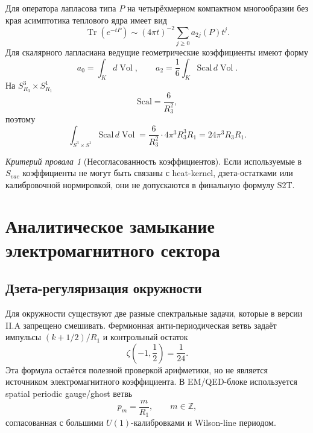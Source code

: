 \documentclass[12pt,a4paper]{report}
\theoremstyle{remark}
\newtheorem{nogocriterion}{Критерий провала}[chapter]
\DeclareMathOperator{\Tr}{Tr}
\DeclareMathOperator{\Vol}{Vol}
\begin{document}
Для оператора лапласова типа \(P\) на четырёхмерном компактном многообразии без края асимптотика теплового ядра имеет вид
\begin{equation}
    \Tr(e^{-tP})\sim (4\pi t)^{-2}\sum_{j\geq 0} a_{2j}(P)t^j.
\end{equation}
Для скалярного лапласиана ведущие геометрические коэффициенты имеют форму
\begin{equation}
    a_0=\int_K d\Vol,
    \qquad
    a_2=\frac{1}{6}\int_K \mathrm{Scal}\,d\Vol.
\end{equation}
На \(S^3_{R_3}\times S^1_{R_1}\)
\begin{equation}
    \mathrm{Scal}=\frac{6}{R_3^2},
\end{equation}
поэтому
\begin{equation}
    \int_{S^3\times S^1}\mathrm{Scal}\,d\Vol
    =\frac{6}{R_3^2}\cdot 4\pi^3 R_3^3R_1
    =24\pi^3 R_3R_1.
\end{equation}

\begin{nogocriterion}[Несогласованность коэффициентов]
Если используемые в \(S_{vac}\) коэффициенты не могут быть связаны с heat-kernel, дзета-остатками или калибровочной нормировкой, они не допускаются в финальную формулу S2T.
\end{nogocriterion}

\chapter{Аналитическое замыкание электромагнитного сектора}


\section{Дзета-регуляризация окружности}

Для окружности существуют две разные спектральные задачи, которые в версии II.A запрещено смешивать. Фермионная анти-периодическая ветвь задаёт импульсы \((k+1/2)/R_1\) и контрольный остаток
\begin{equation}
    \zeta\left(-1,\frac12\right)=\frac{1}{24}.
\end{equation}
Эта формула остаётся полезной проверкой арифметики, но не является источником электромагнитного коэффициента. В EM/QED-блоке используется spatial periodic gauge/ghost ветвь
\begin{equation}
    p_m=\frac{m}{R_1},
    \qquad m\in\mathbb{Z},
\end{equation}
согласованная с большими \(U(1)\)-калибровками и Wilson-line периодом.
\end{document}
